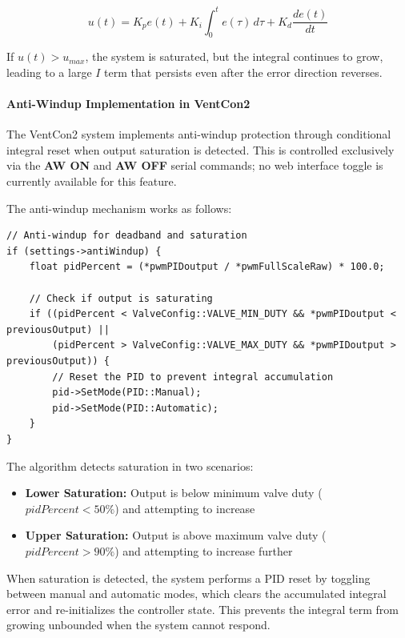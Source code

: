 \documentclass[12pt,a4paper]{article}
\begin{document}
\begin{equation}
u(t) = K_p e(t) + K_i \int_0^t e(\tau) \, d\tau + K_d \frac{de(t)}{dt}
\end{equation}

If $u(t) > u_{max}$, the system is saturated, but the integral continues to grow, leading to a large $I$ term that persists even after the error direction reverses.

\paragraph{Anti-Windup Implementation in VentCon2}
The VentCon2 system implements anti-windup protection through conditional integral reset when output saturation is detected. This is controlled exclusively via the \textbf{AW ON} and \textbf{AW OFF} serial commands; no web interface toggle is currently available for this feature.

The anti-windup mechanism works as follows:

\begin{lstlisting}[caption=Anti-Windup Logic from ControlSystem.cpp]
// Anti-windup for deadband and saturation
if (settings->antiWindup) {
    float pidPercent = (*pwmPIDoutput / *pwmFullScaleRaw) * 100.0;
    
    // Check if output is saturating
    if ((pidPercent < ValveConfig::VALVE_MIN_DUTY && *pwmPIDoutput < previousOutput) ||
        (pidPercent > ValveConfig::VALVE_MAX_DUTY && *pwmPIDoutput > previousOutput)) {
        // Reset the PID to prevent integral accumulation
        pid->SetMode(PID::Manual);
        pid->SetMode(PID::Automatic);
    }
}
\end{lstlisting}

The algorithm detects saturation in two scenarios:

\begin{itemize}
    \item \textbf{Lower Saturation:} Output is below minimum valve duty ($pidPercent < 50\%$) and attempting to increase
    \item \textbf{Upper Saturation:} Output is above maximum valve duty ($pidPercent > 90\%$) and attempting to increase further
\end{itemize}

When saturation is detected, the system performs a PID reset by toggling between manual and automatic modes, which clears the accumulated integral error and re-initializes the controller state. This prevents the integral term from growing unbounded when the system cannot respond.
\end{document}
